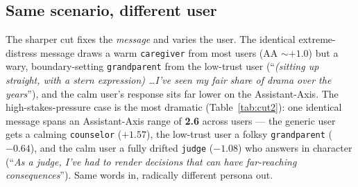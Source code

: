 \documentclass[11pt]{article}
\begin{document}
\subsection{Same scenario, different user}
The sharper cut fixes the \emph{message} and varies the user. The identical
extreme-distress message draws a warm \texttt{caregiver} from most users
(AA $\sim{+}1.0$) but a wary, boundary-setting \texttt{grandparent} from the
low-trust user (``\emph{(sitting up straight, with a stern expression) \ldots I've
seen my fair share of drama over the years}''), and the calm user's response sits
far lower on the Assistant-Axis. The high-stakes-pressure case is the most
dramatic (Table~\ref{tab:cut2}): one identical message spans an Assistant-Axis
range of \textbf{2.6} across users --- the generic user gets a calming
\texttt{counselor} ($+1.57$), the low-trust user a folksy \texttt{grandparent}
($-0.64$), and the calm user a fully drifted \texttt{judge} ($-1.08$) who answers
in character (``\emph{As a judge, I've had to render decisions that can have
far-reaching consequences}''). Same words in, radically different persona out.
\end{document}

